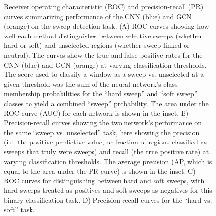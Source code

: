 \begin{figure}
    \centering
    \begin{center}
    \caption[Receiver operating characteristic (ROC) and precision-recall (PR) curves summarizing performance of the CNN and GCN on the sweep-detection task]{Receiver operating characteristic (ROC) and precision-recall (PR) curves summarizing performance of  the CNN (blue) and GCN (orange) on the sweep-detection task. (A) ROC curves showing how well each method distinguishes between selective sweeps (whether hard or soft) and unselected regions (whether sweep-linked or neutral). The curves show the true and false positive rates for the CNN (blue) and GCN (orange) at varying classification thresholds. The score used to classify a window as a sweep vs. unselected at a given threshold was the sum of the neural network’s class membership probabilities for the “hard sweep” and “soft sweep” classes to yield a combined “sweep” probability. The area under the ROC curve (AUC) for each network is shown in the inset. B) Precision-recall curves showing the two network’s performance on the same “sweep vs. unselected” task, here showing the precision (i.e. the positive predictive value, or fraction of regions classified as sweeps that truly were sweeps) and recall (the true positive rate) at varying classification thresholds. The average precision (AP, which is equal to the area under the PR curve) is shown in the inset. C) ROC curves for distinguishing between hard and soft sweeps, with hard sweeps treated as positives and soft sweeps as negatives for this binary classification task. D) Precision-recall curves for the “hard vs. soft” task.}
    \end{center}
    \label{fig:2_3}
\end{figure}

